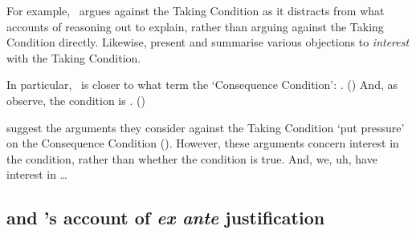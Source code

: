 \begin{note}
{    For example,~\citeauthor{Hlobil:2014tq} argues against the Taking Condition as it distracts from what accounts of reasoning out to explain, rather than arguing against the Taking Condition directly.
    Likewise, \citeauthor{McHugh:2016vp} present and summarise various objections to \emph{interest} with the Taking Condition.

    In particular,~\supportI{} is closer to what \citeauthor{McHugh:2016vp} term the `Consequence Condition': .
    (\citeyear[316]{McHugh:2016vp})
    And, as \citeauthor{McHugh:2016vp} observe, the condition is .
    (\citeyear[316]{McHugh:2016vp})

    \citeauthor{McHugh:2016vp} suggest the arguments they consider against the Taking Condition `put pressure' on the Consequence Condition (\citeyear[327]{McHugh:2016vp}).
    However, these arguments concern interest in the condition, rather than whether the condition is true.
    And, we, uh, have interest in \dots
  }
\end{note}



\subsection*{\supportII{} and \citeauthor{Goldman:1979ui}'s account of \emph{ex ante} justification}


